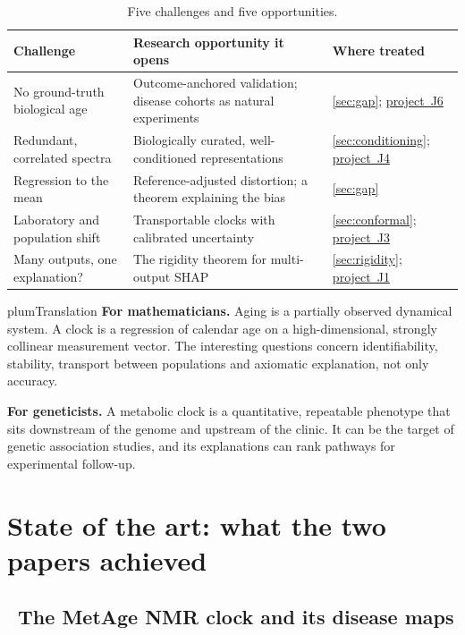 \documentclass[11pt,a4paper]{article}
\newcommand{\card}[1]{\hyperref[card:#1]{project~#1}}
\newenvironment{translation}{\begin{callout}{plum}{Translation}}{\end{callout}}
\theoremstyle{plain}
\theoremstyle{definition}
\theoremstyle{remark}
\begin{document}
\begin{table}[h]
\small
\begin{tabularx}{\linewidth}{@{}lXX@{}}
\toprule
\textbf{Challenge} & \textbf{Research opportunity it opens} & \textbf{Where treated}\\
\midrule
No ground-truth biological age & Outcome-anchored validation; disease cohorts as natural experiments & \cref{sec:gap}; \card{J6}\\
Redundant, correlated spectra & Biologically curated, well-conditioned representations & \cref{sec:conditioning}; \card{J4}\\
Regression to the mean & Reference-adjusted distortion; a theorem explaining the bias & \cref{sec:gap}\\
Laboratory and population shift & Transportable clocks with calibrated uncertainty & \cref{sec:conformal}; \card{J3}\\
Many outputs, one explanation? & The rigidity theorem for multi-output SHAP & \cref{sec:rigidity}; \card{J1}\\
\bottomrule
\end{tabularx}
\caption{Five challenges and five opportunities.}
\end{table}

\begin{translation}
\textbf{For mathematicians.} Aging is a partially observed dynamical system. A clock is a regression of calendar age on a high-dimensional, strongly collinear measurement vector. The interesting questions concern identifiability, stability, transport between populations and axiomatic explanation, not only accuracy.

\textbf{For geneticists.} A metabolic clock is a quantitative, repeatable phenotype that sits downstream of the genome and upstream of the clinic. It can be the target of genetic association studies, and its explanations can rank pathways for experimental follow-up.
\end{translation}

\section{State of the art: what the two papers achieved}
\label{sec:state}

\subsection{\PI\ The MetAge NMR clock and its disease maps}
\label{sec:P1}
\end{document}

